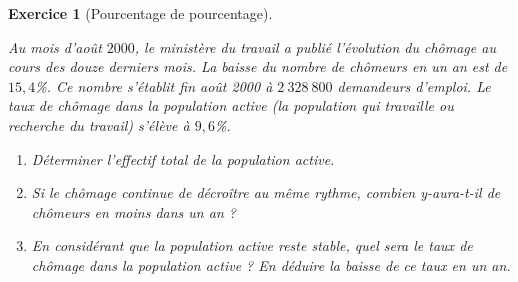 \documentclass [10pt,a4paper] {article}
\def\ben{\begin{enumerate}}
\def\een{\end{enumerate}}
\newtheorem{exo}{Exercice}
\begin{document}
\begin{exo}[Pourcentage de pourcentage]

\textcolor{white}{s}

Au mois d'août $2000$, le ministère du travail a publié l’évolution du chômage au
cours des douze derniers mois. La baisse du nombre de chômeurs en un an est de
$15,4$\%. Ce nombre s’établit fin août 2000 à $2\ 328\ 800$ demandeurs d’emploi.
Le taux de chômage dans la population active (la population qui travaille ou
recherche du travail) s’élève à $9,6$\%.

\ben
\item Déterminer l’effectif total de la population active.
\item Si le chômage continue de décroître au même rythme, combien y-aura-t-il
de chômeurs en moins dans un an ?
\item En considérant que la population active reste stable, quel sera le taux de
chômage dans la population active ? En déduire la baisse de ce taux en un an.
\een
\end{exo}
\vspace{0.25cm}
\end{document}
